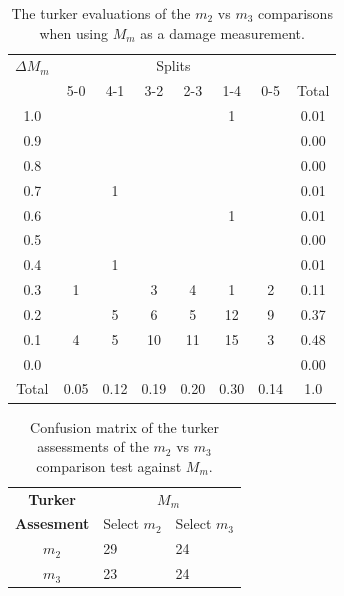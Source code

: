 \begin{table}
\begin{tabular}{ c | c | c | c | c | c | c || c}
    {$\Delta M_m$} &  \multicolumn{6}{c}{Splits}\\
  & 5-0 & 4-1 & 3-2 & 2-3 & 1-4 & 0-5 & Total\\
\hline
1.0 &  &  &  &  & 1 & & 0.01\\
0.9 &  &  &  &  &  & & 0.00\\
0.8 &  &  &  &  &  & & 0.00\\
0.7 &  & 1 &  &  &  & & 0.01\\
0.6 &  &  &  &  & 1 & & 0.01\\
0.5 &  &  &  &  &  & & 0.00\\
0.4 &  & 1 &  &  &  & & 0.01\\
0.3 & 1 &  & 3 & 4 & 1 & 2& 0.11\\
0.2 &  & 5 & 6 & 5 & 12 & 9& 0.37\\
0.1 & 4 & 5 & 10 & 11 & 15 & 3& 0.48\\
0.0 &  &  &  &  &  & & 0.00\\
\hline
Total & 0.05 & 0.12 & 0.19 & 0.20 & 0.30 & 0.14 & 1.0
\end{tabular}
  \caption{The turker evaluations of the $m_2$ vs $m_3$ comparisons when using $M_m$ as a damage measurement.}
  \label{m1table}
\end{table}

\begin{table}
\centering
\begin{tabular}{cll}
\textbf{Turker} & \multicolumn{2}{c}{ \textbf{ $M_{m}$}}                           \\
\textbf{Assesment}                  &          Select $m_{2}$             &           Select $m_{3}$             \\ \cline{2-3} 
       $m_{2}$           & \multicolumn{1}{|l}{29} & \multicolumn{1}{|l|}{24} \\ \cline{2-3} 
       $m_{3}$           & \multicolumn{1}{|l}{23} & \multicolumn{1}{|l|}{24} \\ \cline{2-3} 
\end{tabular}
  \caption{Confusion matrix of the turker assessments of the $m_2$ vs $m_3$ comparison test against $M_m$.}
  \label{m1cm}
\end{table}



